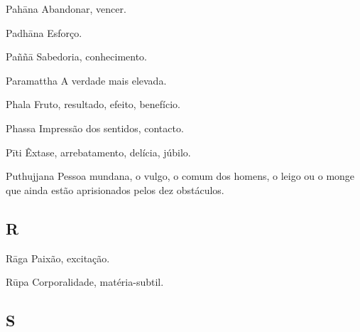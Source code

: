 \begin{glossarydescription}

\item[Pahāna] Abandonar, vencer.

\item[Padhāna] Esforço.

\item[Paññā] Sabedoria, conhecimento.

\item[Paramattha] A verdade mais elevada.

\item[Phala] Fruto, resultado, efeito, benefício.

\item[Phassa] Impressão dos sentidos, contacto.

\item[Pīti] Êxtase, arrebatamento, delícia, júbilo.

\item[Puthujjana] Pessoa mundana, o vulgo, o comum dos homens, o leigo ou o
monge que ainda estão aprisionados pelos dez obstáculos.

\end{glossarydescription}

\subsection{R}

\begin{glossarydescription}

\item[Rāga] Paixão, excitação.

\item[Rūpa] Corporalidade, matéria-subtil.

\end{glossarydescription}

\subsection{S}

